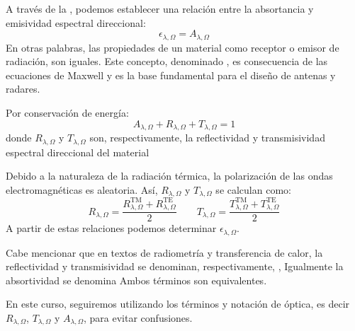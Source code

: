 \documentclass[letterpaper,10pt,english]{jupyterBook}
\begin{document}
\sphinxAtStartPar
A través de la , podemos establecer una relación entre la absortancia y emisividad espectral direccional:
\label{equation:6_RadiacionTermica/6_RadiacionTermica:ab60c71a-9d21-46ad-b21c-f7d018f721df}\begin{equation}
\epsilon_{\lambda,\Omega} = A_{\lambda,\Omega}
\end{equation}
\sphinxAtStartPar
En otras palabras, las propiedades de un material como receptor o emisor de radiación, son iguales. Este concepto, denominado , es consecuencia de las ecuaciones de Maxwell y es la base fundamental para el diseño de antenas y radares.

\sphinxAtStartPar
Por conservación de energía:
\label{equation:6_RadiacionTermica/6_RadiacionTermica:ddc2a57f-cd8b-4c2d-a883-02d3e42e90d3}\begin{equation}
A_{\lambda,\Omega} + R_{\lambda,\Omega} + T_{\lambda,\Omega} = 1
\end{equation}
\sphinxAtStartPar
donde \(R_{\lambda,\Omega}\) y \(T_{\lambda,\Omega}\) son, respectivamente, la reflectividad y transmisividad espectral direccional del material

\sphinxAtStartPar
Debido a la naturaleza de la radiación térmica, la polarización de las ondas electromagnéticas es aleatoria. Así, \(R_{\lambda,\Omega}\) y \(T_{\lambda,\Omega}\) se calculan como:
\label{equation:6_RadiacionTermica/6_RadiacionTermica:d42a9bb2-3965-4f1a-a000-bbaccd0f05b5}\begin{equation}
R_{\lambda,\Omega} = \frac{R_{\lambda,\Omega}^\mathrm{TM}+R_{\lambda,\Omega}^\mathrm{TE}}{2}\quad\quad
T_{\lambda,\Omega} = \frac{T_{\lambda,\Omega}^\mathrm{TM}+T_{\lambda,\Omega}^\mathrm{TE}}{2}
\end{equation}
\sphinxAtStartPar
A partir de estas relaciones podemos determinar \(\epsilon_{\lambda,\Omega}\).

\sphinxAtStartPar
Cabe mencionar que en textos de radiometría y transferencia de calor, la reflectividad y transmisividad se denominan, respectivamente, ,  Igualmente la absortividad se denomina  Ambos términos son equivalentes.

\sphinxAtStartPar
En este curso, seguiremos utilizando los términos y notación de óptica, es decir \(R_{\lambda,\Omega}\), \(T_{\lambda,\Omega}\) y \(A_{\lambda,\Omega}\), para evitar confusiones.
\end{document}
